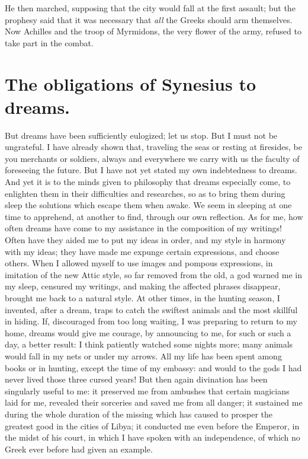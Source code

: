 \documentclass[12pt]{article}
\begin{document}
\noindent He then marched, supposing that the city would fall at the first
assault; but the prophesy said that it was necessary that \textit{all} the
Greeks should arm themselves. Now Achilles and the troop of Myrmidons, the very
flower of the army, refused to take part in the combat.


\section{The obligations of Synesius to dreams.}

But dreams have been sufficiently eulogized; let us stop. But I must not be
ungrateful. I have already shown that, traveling the seas or resting at
firesides, be you merchants or soldiers, always and everywhere we carry with us
the faculty of foreseeing the future. But I have not yet stated my own
indebtedness to dreams. And yet it is to the minds given to philosophy that
dreams especially come, to enlighten them in their difficulties and researches,
so as to bring them during sleep the solutions which escape them when awake. We
seem in sleeping at one time to apprehend, at another to find, through our own
reflection. As for me, how often dreams have come to my assistance in the
composition of my writings! Often have they aided me to put my ideas in order,
and my style in harmony with my ideas; they have made me expunge certain
expressions, and choose others. When I allowed myself to use images and pompous
expressions, in imitation of the new Attic style, so far removed from the old,
a god warned me in my sleep, censured my writings, and making the affected
phrases disappear, brought me back to a natural style. At other times, in the
hunting season, I invented, after a dream, traps to catch the swiftest animals
and the most skillful in hiding. If, discouraged from too long waiting, I was
preparing to return to my home, dreams would give me courage, by announcing to
me, for such or such a day, a better result: I think patiently watched some
nights more; many animals would fall in my nets or under my arrows. All my life
has been spent among books or in hunting, except the time of my embassy: and
would to the gods I had never lived those three cursed years! But then again
divination has been singularly useful to me: it preserved me from ambushes that
certain magicians laid for me, revealed their sorceries and saved me from all
danger; it sustained me during the whole duration of the missing which has
caused to prosper the greatest good in the cities of Libya; it conducted me
even before the Emperor, in the midst of his court, in which I have spoken with
an independence, of which no Greek ever before had given an example.
\end{document}

